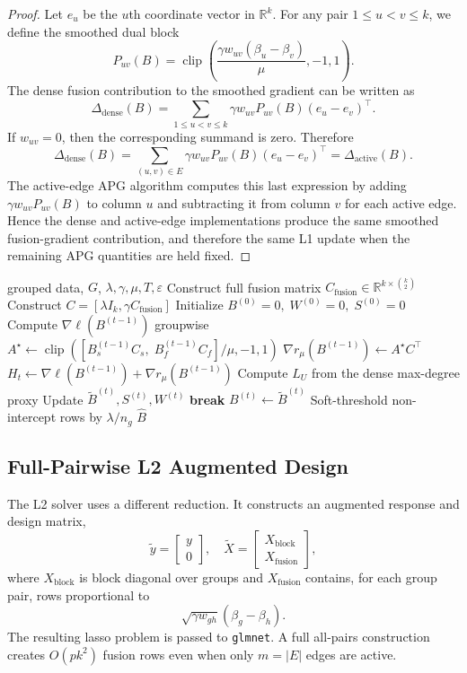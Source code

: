 \documentclass[twoside,11pt]{article}
\newcommand{\R}{\mathbb{R}}
\newcommand{\norm}[1]{\left\lVert #1 \right\rVert}
\DeclareMathOperator{\clip}{clip}
\begin{document}
\begin{proof}
Let $e_u$ be the $u$th coordinate vector in $\R^k$. 
For any pair $1\leq u<v\leq k$, we define the smoothed dual block
\[
  P_{uv}(B)
  =
  \clip\left(
  \frac{\gamma w_{uv}(\beta_u-\beta_v)}{\mu},-1,1
  \right).
\]
The dense fusion contribution to the smoothed gradient can be written as
\[
  \Delta_{\mathrm{dense}}(B)
  =
  \sum_{1\leq u<v\leq k}
  \gamma w_{uv} P_{uv}(B)(e_u-e_v)^\top .
\]
If $w_{uv}=0$, then the corresponding summand is zero. Therefore
\[
  \Delta_{\mathrm{dense}}(B)
  =
  \sum_{(u,v)\in E}
  \gamma w_{uv} P_{uv}(B)(e_u-e_v)^\top
  =
  \Delta_{\mathrm{active}}(B).
\]
The active-edge APG algorithm computes this last expression by adding $\gamma w_{uv}P_{uv}(B)$ to column $u$ and subtracting it from column $v$ for each active edge.
Hence the dense and active-edge implementations produce the same smoothed fusion-gradient contribution, and therefore the same L1 update when the remaining APG quantities are held fixed.
\end{proof}

\begin{algorithm}[H]
\caption{Full-Pairwise APG Reference}
\label{alg:old_l1}
\begin{algorithmic}[1]
\Require grouped data, $G$, $\lambda,\gamma,\mu,T,\varepsilon$
\State Construct full fusion matrix $C_{\mathrm{fusion}}\in\R^{k\times \binom{k}{2}}$
\State Construct $C=[\lambda I_k,\gamma C_{\mathrm{fusion}}]$
\State Initialize $B^{(0)}=0,\;W^{(0)}=0,\;S^{(0)}=0$
  \State Compute $\nabla \ell(B^{(t-1)})$ groupwise
  \State $A^\star\gets
  \clip\!\left([B_s^{(t-1)}C_s,\;B_f^{(t-1)}C_f]/\mu,-1,1\right)$
  \State $\nabla r_\mu(B^{(t-1)})\gets A^\star C^\top$
  \State $H_t \gets \nabla \ell(B^{(t-1)})+\nabla r_\mu(B^{(t-1)})$
  \State Compute $L_U$ from the dense max-degree proxy
  \State Update $\tilde B^{(t)},S^{(t)},W^{(t)}$
  \If{$\norm{\tilde B^{(t)}-B^{(t-1)}}_1<\varepsilon p$}
    \State \textbf{break}
  \EndIf
  \State $B^{(t)}\gets \tilde B^{(t)}$
\EndFor
\State Soft-threshold non-intercept rows by $\lambda/n_g$
\State \Return $\hat B$
\end{algorithmic}
\end{algorithm}


\subsection{Full-Pairwise L2 Augmented Design}
The L2 solver uses a different reduction. 
It constructs an augmented response and design matrix,
\[
  \tilde y =
  \begin{bmatrix} y \\ 0 \end{bmatrix}, \quad
  \tilde X =
  \begin{bmatrix} X_{\mathrm{block}} \\ X_{\mathrm{fusion}} \end{bmatrix},
\]
where $X_{\mathrm{block}}$ is block diagonal over groups and $X_{\mathrm{fusion}}$ contains, for each group pair, rows proportional to
\[
  \sqrt{\gamma w_{gh}}(\beta_g-\beta_h).
\]
The resulting lasso problem is passed to \texttt{glmnet}. 
A full all-pairs construction creates $O(p k^2)$ fusion rows even when only $m=|E|$ edges are active.
\end{document}
